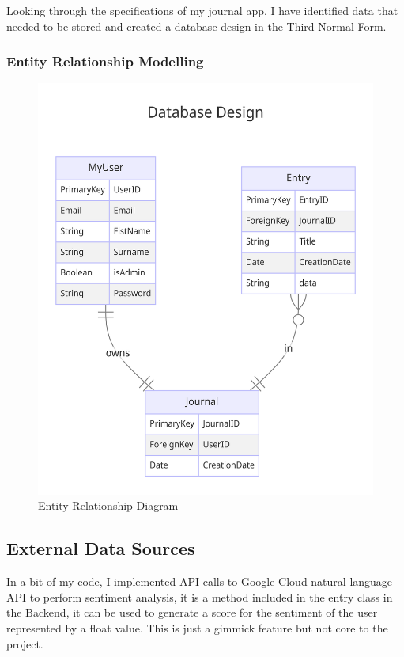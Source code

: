 Looking through the specifications of my journal app, I have identified data that needed to be stored and created a database design in the Third Normal Form.

\subsubsection{Entity Relationship Modelling}
\begin{figure}[!hbt]
    \centering
    \includegraphics[width=\linewidth]{Assets/Journal Hierarchy ER diagram-2024-03-18-085346.png}
    \caption{Entity Relationship Diagram}
    \label{fig:ER}
\end{figure}



\subsection{External Data Sources}
In a bit of my code, I implemented API calls to Google Cloud natural language API to perform sentiment analysis, it is a method included in the entry class in the Backend, it can be used to generate a score for the sentiment of the user represented by a float value. This is just a gimmick feature but not core to the project.

